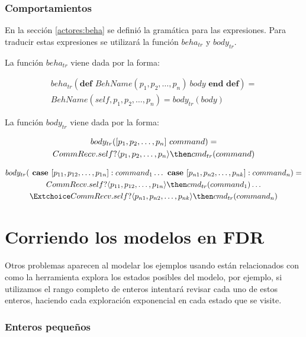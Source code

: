 \subsubsection*{Comportamientos}
En la sección \ref{actores:beha} se definió la gramática para las expresiones. Para traducir estas expresiones se utilizará la función $beha_{tr}$ y $body_{tr}$.

La función $beha_{tr}$ viene dada por la forma:

\begin{multline*}
beha_{tr}(\textbf{def } BehName(p_1, p_2,\ldots, p_n)\ body \textbf{ end def}) = \\
BehName(self, p_1, p_2,\ldots, p_n) = body_{tr}(body) 
\end{multline*}

La función $body_{tr}$ viene dada por la forma:

\begin{multline*}
body_{tr}([ p_1, p_2,\ldots, p_n]\ command) = \\
 CommRecv.self?\langle p_1, p_2,\ldots, p_n \rangle \then cmd_{tr}(command)
\end{multline*}

\begin{multline*}
body_{tr}(\textbf{ case } [p_{11}, p_{12},\ldots, p_{1n}]: command_1 \ldots \textbf{ case } [p_{n1}, p_{n2},\ldots, p_{nk}]: command_n ) = \\
CommRecv.self?\langle p_{11}, p_{12},\ldots, p_{1n} \rangle \then cmd_{tr}(command_1) \ldots \\
\Extchoice CommRecv.self?\langle p_{n1}, p_{n2},\ldots, p_{nk} \rangle \then cmd_{tr}(command_n) 
\end{multline*}

\section{Corriendo los modelos en FDR}

Otros problemas aparecen al modelar los ejemplos usando \FDR están relacionados con como la herramienta explora los estados posibles del modelo, por ejemplo, si utilizamos el rango completo de enteros intentará revisar cada uno de estos enteros, haciendo cada exploración exponencial en cada estado que se visite. 

\subsubsection*{Enteros pequeños}

